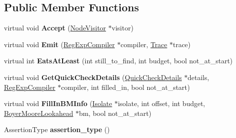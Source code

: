 \subsection*{Public Member Functions}
\begin{DoxyCompactItemize}
\item 
virtual void {\bfseries Accept} (\hyperlink{classv8_1_1internal_1_1_node_visitor}{Node\+Visitor} $\ast$visitor)\hypertarget{classv8_1_1internal_1_1_assertion_node_a76eda020ebd409df34ec748dfbbc02bc}{}\label{classv8_1_1internal_1_1_assertion_node_a76eda020ebd409df34ec748dfbbc02bc}

\item 
virtual void {\bfseries Emit} (\hyperlink{classv8_1_1internal_1_1_reg_exp_compiler}{Reg\+Exp\+Compiler} $\ast$compiler, \hyperlink{classv8_1_1internal_1_1_trace}{Trace} $\ast$trace)\hypertarget{classv8_1_1internal_1_1_assertion_node_a17e2a023a3d233b767f5222087e85672}{}\label{classv8_1_1internal_1_1_assertion_node_a17e2a023a3d233b767f5222087e85672}

\item 
virtual int {\bfseries Eats\+At\+Least} (int still\+\_\+to\+\_\+find, int budget, bool not\+\_\+at\+\_\+start)\hypertarget{classv8_1_1internal_1_1_assertion_node_a1524215fa69f2427d08dc13c0bce27d1}{}\label{classv8_1_1internal_1_1_assertion_node_a1524215fa69f2427d08dc13c0bce27d1}

\item 
virtual void {\bfseries Get\+Quick\+Check\+Details} (\hyperlink{classv8_1_1internal_1_1_quick_check_details}{Quick\+Check\+Details} $\ast$details, \hyperlink{classv8_1_1internal_1_1_reg_exp_compiler}{Reg\+Exp\+Compiler} $\ast$compiler, int filled\+\_\+in, bool not\+\_\+at\+\_\+start)\hypertarget{classv8_1_1internal_1_1_assertion_node_ad7ff94c39e2c1ce7660583e2d958c81f}{}\label{classv8_1_1internal_1_1_assertion_node_ad7ff94c39e2c1ce7660583e2d958c81f}

\item 
virtual void {\bfseries Fill\+In\+B\+M\+Info} (\hyperlink{classv8_1_1internal_1_1_isolate}{Isolate} $\ast$isolate, int offset, int budget, \hyperlink{classv8_1_1internal_1_1_boyer_moore_lookahead}{Boyer\+Moore\+Lookahead} $\ast$bm, bool not\+\_\+at\+\_\+start)\hypertarget{classv8_1_1internal_1_1_assertion_node_a61c63fdb2f179b1f4991b3702580f83e}{}\label{classv8_1_1internal_1_1_assertion_node_a61c63fdb2f179b1f4991b3702580f83e}

\item 
Assertion\+Type {\bfseries assertion\+\_\+type} ()\hypertarget{classv8_1_1internal_1_1_assertion_node_a1c1279600bc32129daf91cb75c982e09}{}\label{classv8_1_1internal_1_1_assertion_node_a1c1279600bc32129daf91cb75c982e09}

\end{DoxyCompactItemize}

